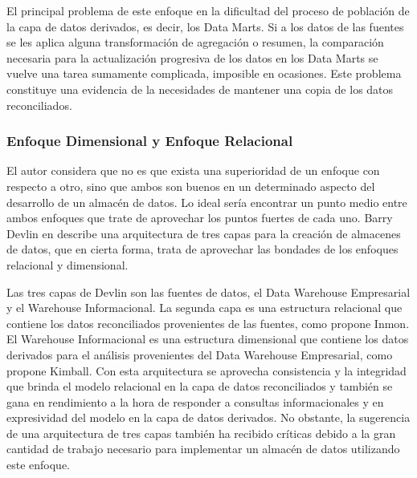 El principal problema de este enfoque en la dificultad del proceso de poblaci\'on de la capa de datos derivados, es decir, los 
Data Marts. Si a  los datos de las fuentes se les aplica alguna transformaci\'on de agregaci\'on o resumen, la comparaci\'on 
necesaria para la actualización progresiva de los datos en los Data Marts se vuelve una tarea sumamente complicada, imposible en 
ocasiones. Este problema constituye una evidencia de la necesidades de mantener una copia de los datos reconciliados\cite{mijailmaster}.

\subsubsection{Enfoque Dimensional y Enfoque Relacional}

El autor considera que no es que exista una superioridad de un enfoque con respecto a otro, sino que ambos son buenos en 
un determinado aspecto del desarrollo de un almac\'en de datos. Lo ideal ser\'ia encontrar un punto medio entre ambos 
enfoques que trate de aprovechar los puntos fuertes de cada uno. Barry Devlin en \cite{devlin1996data} describe 
una arquitectura de tres capas para la creaci\'on de almacenes de datos, que en cierta forma, trata de aprovechar las 
bondades de los enfoques relacional y dimensional. 

Las tres capas de Devlin son las fuentes de datos, el Data Warehouse Empresarial y el Warehouse Informacional. La segunda capa 
es una estructura relacional que contiene los datos reconciliados provenientes de las fuentes, como propone Inmon. El Warehouse 
Informacional es una estructura dimensional que contiene los datos derivados para el an\'alisis provenientes del Data Warehouse 
Empresarial, como propone Kimball. Con esta arquitectura se aprovecha consistencia y la integridad que brinda el modelo relacional 
en la capa de datos reconciliados y tambi\'en se gana en rendimiento a la hora de responder a consultas informacionales y en expresividad 
del modelo en la capa de datos derivados. No obstante, la sugerencia de una arquitectura de tres capas también ha recibido críticas 
debido a la gran cantidad de trabajo necesario para implementar un almacén de datos utilizando este enfoque. 
